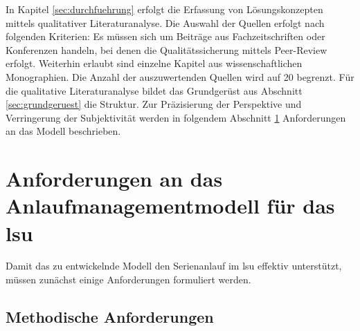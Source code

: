 In Kapitel \ref{sec:durchfuehrung} erfolgt die Erfassung von Lösungskonzepten mittels qualitativer Literaturanalyse. Die Auswahl der Quellen erfolgt nach folgenden Kriterien:
Es müssen sich um Beiträge aus Fachzeitschriften oder Konferenzen handeln, bei denen die Qualitätssicherung mittels Peer-Review erfolgt. 
Weiterhin erlaubt sind einzelne Kapitel aus wissenschaftlichen Monographien. Die Anzahl der auszuwertenden Quellen wird auf 20 begrenzt. Für die qualitative Literaturanalyse bildet das Grundgerüst aus Abschnitt \ref{sec:grundgeruest} die Struktur. Zur Präzisierung der Perspektive und Verringerung der Subjektivität werden in folgendem Abschnitt \ref{sec:anforderungen} Anforderungen an das Modell beschrieben. 



\section{Anforderungen an das Anlaufmanagementmodell für das \gls{lsu}}\label{sec:anforderungen}
Damit das zu entwickelnde Modell den Serienanlauf im \gls{lsu} effektiv unterstützt, müssen zunächst einige Anforderungen formuliert werden. 

\subsection*{Methodische Anforderungen}


